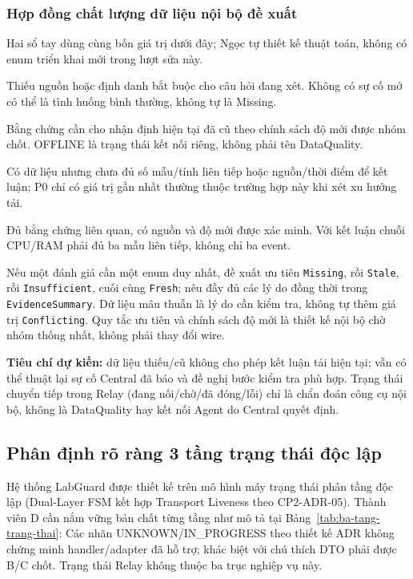 \documentclass[12pt,a4paper]{article}
\begin{document}
\subsubsection{Hợp đồng chất lượng dữ liệu nội bộ đề xuất}
Hai sổ tay dùng cùng bốn giá trị dưới đây; Ngọc tự thiết kế thuật toán, không có enum triển khai mới trong lượt sửa này.
\begin{description}[leftmargin=2.8cm,style=nextline]
\item[\texttt{Missing}] Thiếu nguồn hoặc định danh bắt buộc cho câu hỏi đang xét. Không có sự cố mở có thể là tình huống bình thường, không tự là Missing.
\item[\texttt{Stale}] Bằng chứng cần cho nhận định hiện tại đã cũ theo chính sách độ mới được nhóm chốt. OFFLINE là trạng thái kết nối riêng, không phải tên DataQuality.
\item[\texttt{Insufficient}] Có dữ liệu nhưng chưa đủ số mẫu/tính liên tiếp hoặc nguồn/thời điểm để kết luận; P0 chỉ có giá trị gần nhất thường thuộc trường hợp này khi xét xu hướng tải.
\item[\texttt{Fresh}] Đủ bằng chứng liên quan, có nguồn và độ mới được xác minh. Với kết luận chuỗi CPU/RAM phải đủ ba mẫu liên tiếp, không chỉ ba event.
\end{description}
Nếu một đánh giá cần một enum duy nhất, đề xuất ưu tiên \texttt{Missing}, rồi \texttt{Stale}, rồi \texttt{Insufficient}, cuối cùng \texttt{Fresh}; nêu đầy đủ các lý do đồng thời trong \texttt{EvidenceSummary}. Dữ liệu mâu thuẫn là lý do cần kiểm tra, không tự thêm giá trị \texttt{Conflicting}. Quy tắc ưu tiên và chính sách độ mới là thiết kế nội bộ chờ nhóm thống nhất, không phải thay đổi wire.

\textbf{Tiêu chí dự kiến:} dữ liệu thiếu/cũ không cho phép kết luận tải hiện tại; vẫn có thể thuật lại sự cố Central đã báo và đề nghị bước kiểm tra phù hợp. Trạng thái chuyển tiếp trong Relay (đang nối/chờ/đã đóng/lỗi) chỉ là chẩn đoán công cụ nội bộ, không là DataQuality hay kết nối Agent do Central quyết định.


\subsection{Phân định rõ ràng 3 tầng trạng thái độc lập}
Hệ thống LabGuard được thiết kế trên mô hình máy trạng thái phân tầng độc lập (Dual-Layer FSM kết hợp Transport Liveness theo CP2-ADR-05). Thành viên D cần nắm vững bản chất từng tầng như mô tả tại Bảng~\ref{tab:ba-tang-trang-thai}: Các nhãn UNKNOWN/IN\_PROGRESS theo thiết kế ADR không chứng minh handler/adapter đã hỗ trợ; khác biệt với chú thích DTO phải được B/C chốt. Trạng thái Relay không thuộc ba trục nghiệp vụ này.
\end{document}

